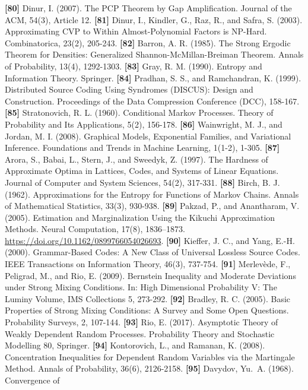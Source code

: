 \documentclass[
]{article}
\begin{document}
\textbf{{[}80{]}} Dinur, I. (2007). The PCP Theorem by Gap
Amplification. Journal of the ACM, 54(3), Article 12.
\textbf{{[}81{]}} Dinur, I., Kindler, G., Raz, R., and Safra, S.
(2003). Approximating CVP to Within Almost-Polynomial Factors is
NP-Hard. Combinatorica, 23(2), 205-243.
\textbf{{[}82{]}} Barron, A. R. (1985). The Strong Ergodic Theorem
for Densities: Generalized Shannon-McMillan-Breiman Theorem. Annals
of Probability, 13(4), 1292-1303.
\textbf{{[}83{]}} Gray, R. M. (1990). Entropy and Information
Theory. Springer.
\textbf{{[}84{]}} Pradhan, S. S., and Ramchandran, K. (1999).
Distributed Source Coding Using Syndromes (DISCUS): Design and
Construction. Proceedings of the Data Compression Conference (DCC),
158-167.
\textbf{{[}85{]}} Stratonovich, R. L. (1960). Conditional Markov
Processes. Theory of Probability and Its Applications, 5(2), 156-178.
\textbf{{[}86{]}} Wainwright, M. J., and Jordan, M. I. (2008).
Graphical Models, Exponential Families, and Variational Inference.
Foundations and Trends in Machine Learning, 1(1-2), 1-305.
\textbf{{[}87{]}} Arora, S., Babai, L., Stern, J., and Sweedyk, Z.
(1997). The Hardness of Approximate Optima in Lattices, Codes, and
Systems of Linear Equations. Journal of Computer and System Sciences,
54(2), 317-331.
\textbf{{[}88{]}} Birch, B. J. (1962). Approximations for the Entropy
for Functions of Markov Chains. Annals of Mathematical Statistics,
33(3), 930-938.
\textbf{{[}89{]}} Pakzad, P., and Anantharam, V. (2005).
Estimation and Marginalization Using the Kikuchi Approximation Methods.
Neural Computation, 17(8), 1836--1873.
\url{https://doi.org/10.1162/0899766054026693}.
\textbf{{[}90{]}} Kieffer, J. C., and Yang, E.-H. (2000). Grammar-Based
Codes: A New Class of Universal Lossless Source Codes. IEEE Transactions
on Information Theory, 46(3), 737-754.
\textbf{{[}91{]}} Merlev\`ede, F., Peligrad, M., and Rio, E. (2009).
Bernstein Inequality and Moderate Deviations under Strong Mixing
Conditions. In: High Dimensional Probability V: The Luminy Volume,
IMS Collections 5, 273-292.
\textbf{{[}92{]}} Bradley, R. C. (2005). Basic Properties of Strong
Mixing Conditions: A Survey and Some Open Questions. Probability
Surveys, 2, 107-144.
\textbf{{[}93{]}} Rio, E. (2017). Asymptotic Theory of Weakly
Dependent Random Processes. Probability Theory and Stochastic
Modelling 80, Springer.
\textbf{{[}94{]}} Kontorovich, L., and Ramanan, K. (2008).
Concentration Inequalities for Dependent Random Variables via the
Martingale Method. Annals of Probability, 36(6), 2126-2158.
\textbf{{[}95{]}} Davydov, Yu.\ A. (1968). Convergence of
\end{document}

